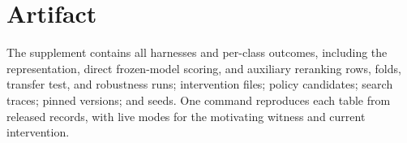 \documentclass[11pt]{article}
\begin{document}
\section{Artifact}
\label{app:artifact}
The supplement contains all harnesses and per-class outcomes, including the
representation, direct frozen-model scoring, and auxiliary reranking rows,
folds, transfer test, and robustness runs;
intervention files; policy candidates; search traces; pinned versions; and
seeds. One command reproduces each table from released records, with live modes
for the motivating witness and current intervention.
\end{document}
